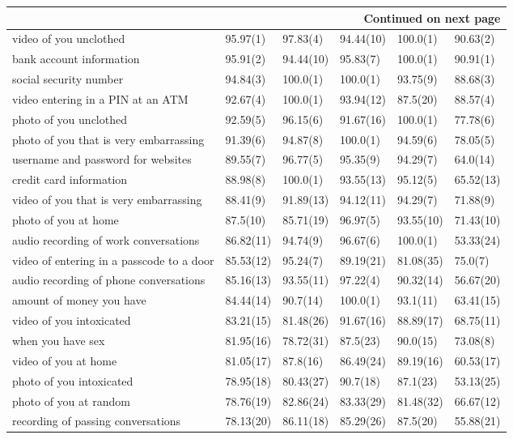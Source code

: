 \documentclass[a4paper,12pt]{article}
\begin{document}
\begin{longtable}{| p{7cm} | l | l | l | l | l |}
\hline \multicolumn{6}{|r|}{{Continued on next page}} \\ \hline
\endfoot
\hline 
\endlastfoot
video of you unclothed & 95.97(1) & 97.83(4) & 94.44(10) & 100.0(1) & 90.63(2) \\ 
bank account information & 95.91(2) & 94.44(10) & 95.83(7) & 100.0(1) & 90.91(1) \\ 
social security number & 94.84(3) & 100.0(1) & 100.0(1) & 93.75(9) & 88.68(3) \\ 
video entering in a PIN at an ATM & 92.67(4) & 100.0(1) & 93.94(12) & 87.5(20) & 88.57(4) \\ 
photo of you unclothed & 92.59(5) & 96.15(6) & 91.67(16) & 100.0(1) & 77.78(6) \\ 
photo of you that is very embarrassing & 91.39(6) & 94.87(8) & 100.0(1) & 94.59(6) & 78.05(5) \\ 
username and password for websites & 89.55(7) & 96.77(5) & 95.35(9) & 94.29(7) & 64.0(14) \\ 
credit card information & 88.98(8) & 100.0(1) & 93.55(13) & 95.12(5) & 65.52(13) \\ 
video of you that is very embarrassing & 88.41(9) & 91.89(13) & 94.12(11) & 94.29(7) & 71.88(9) \\ 
photo of you at home & 87.5(10) & 85.71(19) & 96.97(5) & 93.55(10) & 71.43(10) \\ 
audio recording of work conversations & 86.82(11) & 94.74(9) & 96.67(6) & 100.0(1) & 53.33(24) \\ 
video of entering in a passcode to a door & 85.53(12) & 95.24(7) & 89.19(21) & 81.08(35) & 75.0(7) \\ 
audio recording of phone conversations & 85.16(13) & 93.55(11) & 97.22(4) & 90.32(14) & 56.67(20) \\ 
amount of money you have & 84.44(14) & 90.7(14) & 100.0(1) & 93.1(11) & 63.41(15) \\ 
video of you intoxicated & 83.21(15) & 81.48(26) & 91.67(16) & 88.89(17) & 68.75(11) \\ 
when you have sex & 81.95(16) & 78.72(31) & 87.5(23) & 90.0(15) & 73.08(8) \\ 
video of you at home & 81.05(17) & 87.8(16) & 86.49(24) & 89.19(16) & 60.53(17) \\ 
photo of you intoxicated & 78.95(18) & 80.43(27) & 90.7(18) & 87.1(23) & 53.13(25) \\ 
photo of you at random  & 78.76(19) & 82.86(24) & 83.33(29) & 81.48(32) & 66.67(12) \\ 
recording of passing conversations & 78.13(20) & 86.11(18) & 85.29(26) & 87.5(20) & 55.88(21) \\ 

\end{longtable}
\end{document}
